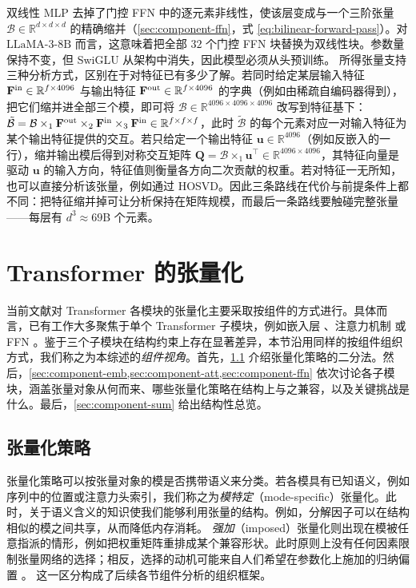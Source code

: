 \documentclass[11pt]{article}
\newcommand{\R}{\mathbb{R}}
\newcommand{\ten}[1]{\mathcal{#1}}
\newcommand{\mat}[1]{\mathbf{#1}}
\newcommand{\vecb}[1]{\mathbf{#1}}
\newcommand{\llama}{\text{LLaMA-3-8B}}
\begin{document}
双线性 MLP \cite{pearce2025bilinearmlp} 去掉了门控 FFN 中的逐元素非线性，使该层变成与一个三阶张量 $\ten{B} \in \R^{d \times d \times d}$ 的精确缩并（\cref{sec:component-ffn}，式 \eqref{eq:bilinear-forward-pass}）。对 $\llama$ 而言，这意味着把全部 $32$ 个门控 FFN 块替换为双线性块。参数量保持不变，但 SwiGLU 从架构中消失，因此模型必须从头预训练。
所得张量支持三种分析方式，区别在于对特征已有多少了解。若同时给定某层输入特征 $\mat{F}^{\rm in} \in \R^{f\times 4096}$ 与输出特征 $\mat{F}^{\rm out} \in \R^{f\times 4096}$ 的字典（例如由稀疏自编码器得到），把它们缩并进全部三个模，即可将 $\ten{B} \in \R^{4096 \times 4096 \times 4096}$ 改写到特征基下：$\tilde{\ten{B}} = \ten{B} \times_1 \mat{F}^{\rm out} \times_2 \mat{F}^{\rm in} \times_3 \mat{F}^{\rm in} \in \R^{f \times f \times f}$，此时 $\tilde{\ten{B}}$ 的每个元素对应一对输入特征为某个输出特征提供的交互。若只给定一个输出特征 $\vecb{u} \in \R^{4096}$（例如反嵌入的一行），缩并输出模后得到对称交互矩阵 $\mat{Q} = \ten{B} \times_1 \vecb{u}^\top \in \R^{4096 \times 4096}$，其特征向量是驱动 $\vecb{u}$ 的输入方向，特征值则衡量各方向二次贡献的权重。若对特征一无所知，也可以直接分析该张量，例如通过 HOSVD。因此三条路线在代价与前提条件上都不同：把特征缩并掉可让分析保持在矩阵规模，而最后一条路线要触碰完整张量——每层有 $d^3 \approx 69$B 个元素。


\section{Transformer 的张量化}
\label{sec:components}

当前文献对 Transformer 各模块的张量化主要采取按组件的方式进行。具体而言，已有工作大多聚焦于单个 Transformer 子模块，例如嵌入层 \cite{xu2023tensorgpt}、注意力机制 \cite{ma2019tensorized} 或 FFN \cite{chekalina2023ttm}。鉴于三个子模块在结构约束上存在显著差异，本节沿用同样的按组件组织方式，我们称之为本综述的\emph{组件视角}。首先，\cref{sec:tensor-strategies} 介绍张量化策略的二分法。然后，\cref{sec:component-emb,sec:component-att,sec:component-ffn} 依次讨论各子模块，涵盖张量对象从何而来、哪些张量化策略在结构上与之兼容，以及关键挑战是什么。最后，\cref{sec:component-sum} 给出结构性总览。


\subsection{张量化策略}
\label{sec:tensor-strategies}

张量化策略可以按张量对象的模是否携带语义来分类。若各模具有已知语义，例如序列中的位置或注意力头索引，我们称之为\emph{模特定}（mode-specific）张量化。此时，关于语义含义的知识使我们能够利用张量的结构。例如，分解因子可以在结构相似的模之间共享，从而降低内存消耗。
\emph{强加}（imposed）张量化则出现在模被任意指派的情形，例如把权重矩阵重排成某个兼容形状。此时原则上没有任何因素限制张量网络的选择；相反，选择的动机可能来自人们希望在参数化上施加的归纳偏置 \cite{hamreras2025tensorization}。
这一区分构成了后续各节组件分析的组织框架。
\end{document}
